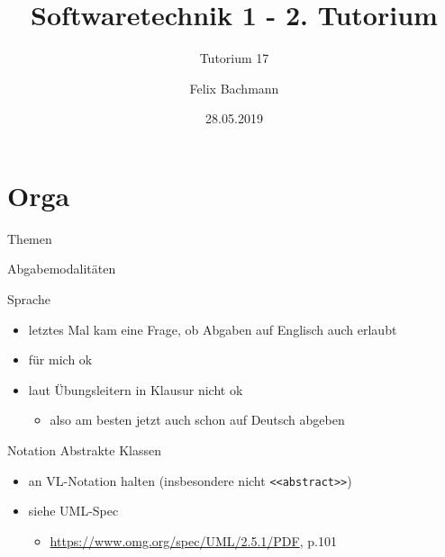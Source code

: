 \documentclass[18pt]{beamer}
\title[SWT1]{Softwaretechnik 1 - 2. Tutorium}
\subtitle{Tutorium 17}
\author{Felix Bachmann}
\date{28.05.2019}
\institute{KIT - Institut für Programmstrukturen und Datenorganisation (IPD)}
\begin{document}

\begin{frame}
\titlepage
\end{frame}

\section{Orga}

\begin{frame}{Themen}
\tableofcontents
\end{frame}



\begin{frame}[fragile]{Abgabemodalitäten}
	\begin{block}{Sprache}
		\begin{itemize}
			\item letztes Mal kam eine Frage, ob Abgaben auf Englisch auch erlaubt
			\item für mich ok
			\item laut Übungsleitern in Klausur nicht ok
			\begin{itemize}
				\item also am besten jetzt auch schon auf Deutsch abgeben
			\end{itemize}
		\end{itemize}
	\end{block}
	\begin{block}{Notation Abstrakte Klassen}
		\begin{itemize}
			\item an VL-Notation halten (insbesondere nicht \verb|<<abstract>>|)
			\item siehe UML-Spec 
			\begin{itemize}
				\item \url{https://www.omg.org/spec/UML/2.5.1/PDF}, p.101
			\end{itemize}
		\end{itemize}
	\end{block}
\end{frame}
\end{document}
